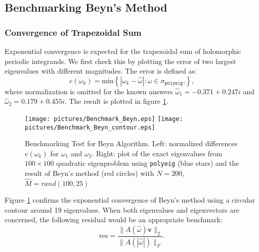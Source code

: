 \documentclass[final,leqno,onefignum,onetabnum]{siamltex1213}
\begin{document}
\subsection{Benchmarking Beyn's Method}
\subsubsection{Convergence of Trapezoidal Sum}
Exponential convergence is expected for the trapezoidal sum of holomorphic periodic integrands. We first check this by plotting the error of two largest eigenvalues with different magnitudes. The error is defined as: 
\begin{equation}
\label{eq:e}
e(\omega_k) = \mathrm{min}\left\lbrace  |\omega_k - \hat{\omega}|:\hat{\omega}\in\sigma_{\mathtt{polyeig}}.\right\rbrace ,
\end{equation}
where normalization is omitted for the known answers  $\hat{\omega}_1 = -0.371 + 0.247i$ and $\hat{\omega}_2=
  0.179 + 0.455i$. The result is plotted in figure \ref{fig:Benchmark_Beyn}. 
\begin{figure}\label{fig:Benchmark_Beyn}
\begin{center}
\texttt{[image: pictures/Benchmark\_Beyn.eps]}
\texttt{[image: pictures/Benchmark\_Beyn\_contour.eps]}
\end{center}
\caption{Benchmarking Test for Beyn Algorithm. \textnormal{Left: normalized differences $e(\omega_k)$ for $\omega_1$ and $\omega_2$. Right: plot of the exact eigenvalues from $100\times100$ quadratic eigenproblem using {\tt polyeig} (blue stars) and the result of Beyn's method (red circles) with $N=200$, $\hat{M}=rand(100,25)$}}
\end{figure}
Figure \ref{fig:Benchmark_Beyn} confirms the exponential convergence of Beyn's method using a circular contour around 19 eigenvalues. When both eigenvalues and eigenvectors are concerned, the following residual would be an appropriate benchmark:
\begin{equation}
\label{eq:Residual}
\mathrm{res}=\frac{\| A(\hat{\omega})\mathbf{\hat{v}} \|_2 }{\|A(|\hat{\omega}|) \|_F}.
\end{equation}

\end{document}
